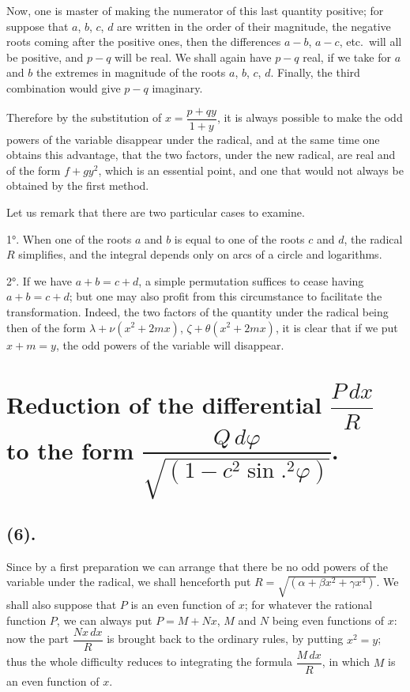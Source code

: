 \documentclass{article}
\begin{document}
Now, one is master of making the numerator of this last quantity positive; for suppose that $a$, $b$, $c$, $d$ are written in the order of their magnitude, the negative roots coming after the positive ones, then the differences $a-b$, $a-c$, etc.\ will all be positive, and $p-q$ will be real. We shall again have $p-q$ real, if we take for $a$ and $b$ the extremes in magnitude of the roots $a$, $b$, $c$, $d$. Finally, the third combination would give $p-q$ imaginary.

Therefore by the substitution of $x=\dfrac{p+qy}{1+y}$, it is always possible to make the odd powers of the variable disappear under the radical, and at the same time one obtains this advantage, that the two factors, under the new radical, are real and of the form $f+gy^{2}$, which is an essential point, and one that would not always be obtained by the first method.

Let us remark that there are two particular cases to examine.

1°. When one of the roots $a$ and $b$ is equal to one of the roots $c$ and $d$, the radical $R$ simplifies, and the integral depends only on arcs of a circle and logarithms.

2°. If we have $a+b=c+d$, a simple permutation suffices to cease having $a+b=c+d$; but one may also profit from this circumstance to facilitate the transformation. Indeed, the two factors of the quantity under the radical being then of the form $\lambda+\nu(x^{2}+2mx)$, $\zeta+\theta(x^{2}+2mx)$, it is clear that if we put $x+m=y$, the odd powers of the variable will disappear.

\section*{Reduction of the differential $\dfrac{P\,dx}{R}$ to the form $\dfrac{Q\,d\varphi}{\sqrt{(1-c^{2}\sin.^{2}\varphi)}}$.}

\subsection*{(6).}

Since by a first preparation we can arrange that there be no odd powers of the variable under the radical, we shall henceforth put $R=\sqrt{(\alpha+\beta x^{2}+\gamma x^{4})}$. We shall also suppose that $P$ is an even function of $x$; for whatever the rational function $P$, we can always put $P=M+Nx$, $M$ and $N$ being even functions of $x$: now the part $\dfrac{Nx\,dx}{R}$ is brought back to the ordinary rules, by putting $x^{2}=y$; thus the whole difficulty reduces to integrating the formula $\dfrac{M\,dx}{R}$, in which $M$ is an even function of $x$.
\end{document}
